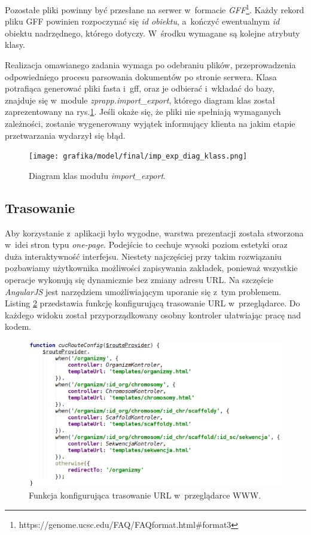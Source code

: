 \documentclass[a4paper,12pt,oneside]{mwrep}  %
\begin{document}
Pozostałe pliki powinny być przesłane na serwer w~formacie \emph{GFF}\footnote{https://genome.ucsc.edu/FAQ/FAQformat.html\#format3}. Każdy rekord pliku GFF powinien rozpoczynać się \emph{id obiektu}, a~kończyć ewentualnym \emph{id} obiektu nadrzędnego, którego dotyczy. W~środku wymagane są kolejne atrybuty klasy.

Realizacja omawianego zadania wymaga po odebraniu plików, przeprowadzenia odpowiedniego procesu parsowania dokumentów po stronie serwera. Klasa potrafiąca generować pliki fasta i~gff, oraz je odbierać i~wkładać do bazy, znajduje się w~module \emph{zprapp.import\_export}, którego diagram klas został zaprezentowany na rys.\ref{diagram_klas_imp_exp}. Jeśli okaże się, że pliki nie spełniają wymaganych zależności, zostanie wygenerowany wyjątek informujący klienta na jakim etapie przetwarzania wydarzył się błąd.
\begin{figure}[h]
\centering
\texttt{[image: grafika/model/final/imp\_exp\_diag\_klass.png]}
\caption{Diagram klas modułu \emph{import\_export}.}
\label{diagram_klas_imp_exp}
\end{figure}

\subsection{Trasowanie}
Aby korzystanie z~aplikacji było wygodne, warstwa prezentacji została stworzona w~idei stron typu \emph{one-page}. Podejście to cechuje wysoki poziom estetyki oraz duża interaktywność interfejsu. Niestety najczęściej przy takim rozwiązaniu pozbawiamy użytkownika możliwości zapisywania zakładek, ponieważ wszystkie operacje wykonują się dynamicznie bez zmiany adresu URL. Na szczęście \emph{AngularJS} jest narzędziem umożliwiającym uporanie się z~tym problemem. Listing \ref{routeprovider} przedstawia funkcję konfigurującą trasowanie URL w~przeglądarce. Do każdego widoku został przyporządkowany osobny kontroler ułatwiając pracę nad kodem.

\begin{figure}[h]
\centering
\renewcommand{\figurename}{Listing.}
\includegraphics[width=1\textwidth]{grafika/routeProvider.png}
\caption{Funkcja konfigurująca trasowanie URL w~przeglądarce WWW.}
\label{routeprovider}
\end{figure}
\end{document}
